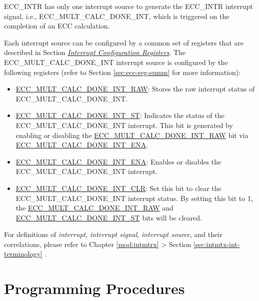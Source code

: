 \documentclass[main\_\_EN.tex]{subfiles}
\begin{document}
ECC\_INTR has only one interrupt source to generate the ECC\_INTR interrupt signal, i.e., \label{int:ECCMULTCALCDONEINT}{ECC\_MULT\_CALC\_DONE\_INT}, which is triggered on the completion of an ECC calculation.

Each interrupt source can be configured by a common set of registers that are described in Section \hyperref[interrupt-config-registers]{\textit{Interrupt Configuration Registers}}. The ECC\_MULT\_CALC\_DONE\_INT interrupt source is configured by the following registers (refer to Section \ref{sec:ecc-reg-summ} \textit{} for more information):

\begin{itemize}
    \item \hyperref[fielddesc:ECCMULTCALCDONEINTRAW]{ECC\_MULT\_CALC\_DONE\_INT\_RAW}: Stores the raw interrupt status of ECC\_MULT\_CALC\_DONE\_INT.
    \item \hyperref[fielddesc:ECCMULTCALCDONEINTST]{ECC\_MULT\_CALC\_DONE\_INT\_ST}: Indicates the status of the ECC\_MULT\_CALC\_DONE\_INT interrupt. This bit is generated by enabling or disabling the \hyperref[fielddesc:ECCMULTCALCDONEINTRAW]{ECC\_MULT\_CALC\_DONE\_INT\_RAW} bit via \hyperref[fielddesc:ECCMULTCALCDONEINTENA]{ECC\_MULT\_CALC\_DONE\_INT\_ENA}.
    \item \hyperref[fielddesc:ECCMULTCALCDONEINTENA]{ECC\_MULT\_CALC\_DONE\_INT\_ENA}: Enables or disables the ECC\_MULT\_CALC\_DONE\_INT interrupt.
    \item \hyperref[fielddesc:ECCMULTCALCDONEINTCLR]{ECC\_MULT\_CALC\_DONE\_INT\_CLR}: Set this bit to clear the ECC\_MULT\_CALC\_DONE\_INT interrupt status. By setting this bit to 1, the \hyperref[fielddesc:ECCMULTCALCDONEINTRAW]{ECC\_MULT\_CALC\_DONE\_INT\_RAW} and  \hyperref[fielddesc:ECCMULTCALCDONEINTST]{ECC\_MULT\_CALC\_DONE\_INT\_ST} bits will be cleared.
\end{itemize}

\begin{tiplisting}
For definitions of \textit{interrupt}, \textit{interrupt signal}, \textit{interrupt source}, and their correlations, please refer to Chapter \ref{mod:intmtrx} \textit{} > Section \ref{sec:intmtx-int-terminology} \textit{}.
\end{tiplisting}


\section{Programming Procedures}
\end{document}
